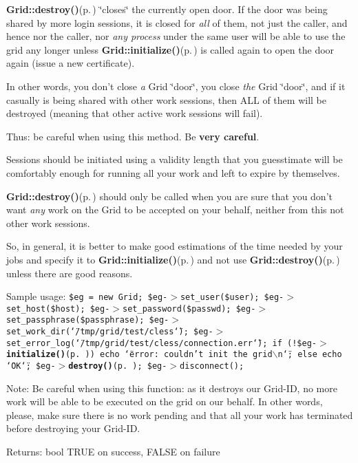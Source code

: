 {\bf Grid::destroy()}{\rm (p.\,\pageref{classGrid_a12})} \char`\"{}closes\char`\"{} the currently open door. If the door was being shared by more login sessions, it is closed for {\em all\/} of them, not just the caller, and hence nor the caller, nor {\em any process\/} under the same user will be able to use the grid any longer unless {\bf Grid::initialize()}{\rm (p.\,\pageref{classGrid_a11})} is called again to open the door again (issue a new certificate).

In other words, you don't close {\em a\/} Grid \char`\"{}door\char`\"{}, you close {\em the\/} Grid \char`\"{}door\char`\"{}, and if it casually is being shared with other work sessions, then ALL of them will be destroyed (meaning that other active work sessions will fail).

Thus: be careful when using this method. Be {\bf very careful}.

Sessions should be initiated using a validity length that you guesstimate will be comfortably enough for running all your work and left to expire by themselves.

{\bf Grid::destroy()}{\rm (p.\,\pageref{classGrid_a12})} should only be called when you are sure that you don't want {\em any\/} work on the Grid to be accepted on your behalf, neither from this not other work sessions.

So, in general, it is better to make good estimations of the time needed by your jobs and specify it to {\bf Grid::initialize()}{\rm (p.\,\pageref{classGrid_a11})} and not use {\bf Grid::destroy()}{\rm (p.\,\pageref{classGrid_a12})} unless there are good reasons.

Sample usage: {\tt  \$eg = new Grid; \$eg-$>$set\_\-user(\$user); \$eg-$>$set\_\-host(\$host); \$eg-$>$set\_\-password(\$passwd); \$eg-$>$set\_\-passphrase(\$passphrase); \$eg-$>$set\_\-work\_\-dir(\char`\"{}/tmp/grid/test/cless\char`\"{}); \$eg-$>$set\_\-error\_\-log(\char`\"{}/tmp/grid/test/cless/connection.err\char`\"{}); if (!\$eg-$>${\bf initialize()}{\rm (p.\,\pageref{classGrid_a11})}) echo \char`\"{}error: couldn't init the grid$\backslash$n\char`\"{}; else echo \char`\"{}OK\char`\"{}; \$eg-$>${\bf destroy()}{\rm (p.\,\pageref{classGrid_a12})}; \$eg-$>$disconnect(); }

\begin{Desc}
\item[Note:]Be careful when using this function: as it destroys our Grid-ID, no more work will be able to be executed on the grid on our behalf. In other words, please, make sure there is no work pending and that all your work has terminated before destroying your Grid-ID.\end{Desc}
\begin{Desc}
\item[Returns:]bool TRUE on success, FALSE on failure \end{Desc}


